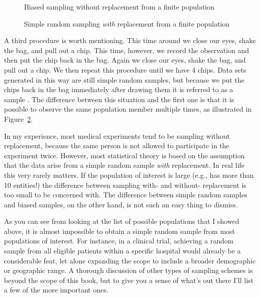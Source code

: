 \begin{figure}[t]
\begin{center}
\end{center}
\caption{Biased sampling without replacement from a finite population}
\label{fig:brs}
\HR
\end{figure}

\begin{figure}[t]
\begin{center}
\end{center}
\caption{Simple random sampling {\it with} replacement from a finite population}
\label{fig:srs2}
\HR
\end{figure}

A third procedure is worth mentioning. This time around we close our eyes, shake the bag, and pull out a chip. This time, however, we record the observation and then put the chip back in the bag. Again we close our eyes, shake the bag, and pull out a chip. We then repeat this procedure until we have 4 chips. Data sets generated in this way are still simple random samples, but because we put the chips back in the bag immediately after drawing them it is referred to as a sample . The difference between this situation and the first one is that it is possible to observe the same population member multiple times, as illustrated in Figure~\ref{fig:srs2}. 

In my experience, most medical experiments tend to be sampling without replacement, because the same person is not allowed to participate in the experiment twice. However, most statistical theory is based on the assumption that the data arise from a simple random sample {\it with} replacement. In real life this very rarely matters. If the population of interest is large (e.g., has more than 10 entities!) the difference between sampling with- and without- replacement is too small to be concerned with. The difference between simple random samples and biased samples, on the other hand, is not such an easy thing to dismiss.


As you can see from looking at the list of possible populations that I showed above, it is almost impossible to obtain a simple random sample from most populations of interest. For instance, in a clinical trial, achieving a random sample from all eligible patients within a specific hospital would already be a considerable feat, let alone expanding the scope to include a broader demographic or geographic range. A thorough discussion of other types of sampling schemes is beyond the scope of this book, but to give you a sense of what's out there I'll list a few of the more important ones.


